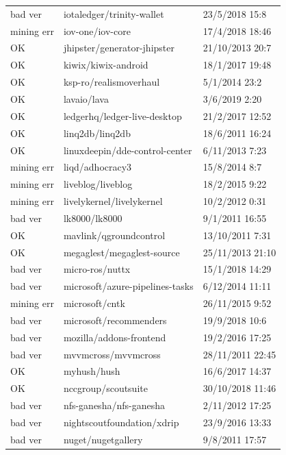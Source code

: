 \begin{appendices}
\begin{center}
\begin{longtable}{|l|l|l|}
            bad ver & iotaledger/trinity-wallet & 23/5/2018 15:8 \\
            mining err & iov-one/iov-core & 17/4/2018 18:46 \\
            OK & jhipster/generator-jhipster & 21/10/2013 20:7 \\
            OK & kiwix/kiwix-android & 18/1/2017 19:48 \\
            OK & ksp-ro/realismoverhaul & 5/1/2014 23:2 \\
            OK & lavaio/lava & 3/6/2019 2:20 \\
            OK & ledgerhq/ledger-live-desktop & 21/2/2017 12:52 \\
            OK & linq2db/linq2db & 18/6/2011 16:24 \\
            OK & linuxdeepin/dde-control-center & 6/11/2013 7:23 \\
            mining err & liqd/adhocracy3 & 15/8/2014 8:7 \\
            mining err & liveblog/liveblog & 18/2/2015 9:22 \\
            mining err & livelykernel/livelykernel & 10/2/2012 0:31 \\
            bad ver & lk8000/lk8000 & 9/1/2011 16:55 \\
            OK & mavlink/qgroundcontrol & 13/10/2011 7:31 \\
            OK & megaglest/megaglest-source & 25/11/2013 21:10 \\
            bad ver & micro-ros/nuttx & 15/1/2018 14:29 \\
            bad ver & microsoft/azure-pipelines-tasks & 6/12/2014 11:11 \\
            mining err & microsoft/cntk & 26/11/2015 9:52 \\
            bad ver & microsoft/recommenders & 19/9/2018 10:6 \\
            bad ver & mozilla/addons-frontend & 19/2/2016 17:25 \\
            bad ver & mvvmcross/mvvmcross & 28/11/2011 22:45 \\
            OK & myhush/hush & 16/6/2017 14:37 \\
            OK & nccgroup/scoutsuite & 30/10/2018 11:46 \\
            bad ver & nfs-ganesha/nfs-ganesha & 2/11/2012 17:25 \\
            bad ver & nightscoutfoundation/xdrip & 23/9/2016 13:33 \\
            bad ver & nuget/nugetgallery & 9/8/2011 17:57 \\

\end{longtable}
\end{center}
\end{appendices}
